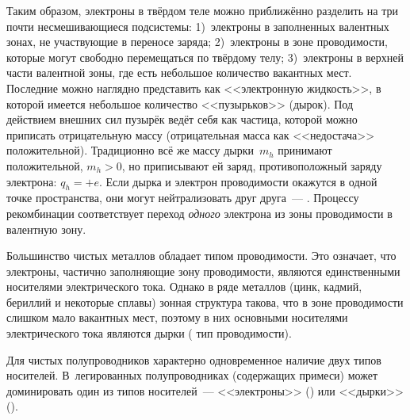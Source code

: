 Таким образом, электроны в твёрдом теле можно приближённо разделить на три
почти несмешивающиеся подсистемы: 1)~электроны в заполненных валентных
зонах, не участвующие в переносе заряда; 2)~электроны в зоне проводимости,
которые могут свободно перемещаться по твёрдому телу;
3)~электроны в верхней части валентной
зоны, где есть небольшое количество вакантных мест.
Последние можно наглядно представить как <<электронную жидкость>>, в которой имеется
небольшое количество <<пузырьков>> (дырок). Под действием внешних сил
пузырёк ведёт себя как частица, которой можно приписать отрицательную массу
(отрицательная масса как <<недостача>> положительной). Традиционно всё же
массу дырки~$m_h$ принимают положительной, $m_h>0$, но приписывают ей
заряд, противоположный заряду электрона: $q_h=+e$.
Если дырка и электрон проводимости окажутся в одной точке пространства,
они могут нейтрализовать друг друга~---
. Процессу рекомбинации соответствует 
переход \emph{одного} электрона из зоны проводимости в валентную зону.

Большинство чистых металлов обладает  типом проводимости.
Это означает, что электроны, частично заполняющие зону проводимости,
являются единственными носителями электрического тока.
Однако в ряде металлов (цинк, кадмий, бериллий и некоторые сплавы) зонная структура
такова, что в зоне проводимости слишком мало вакантных мест, поэтому
в них основными носителями электрического тока являются
дырки ( тип проводимости).

Для чистых полупроводников характерно одновременное наличие двух типов носителей.
В~легированных полупроводниках (содержащих примеси) может доминировать один из
типов носителей~--- <<электроны>> () или 
<<дырки>> ().



\label{sec:ohm}

